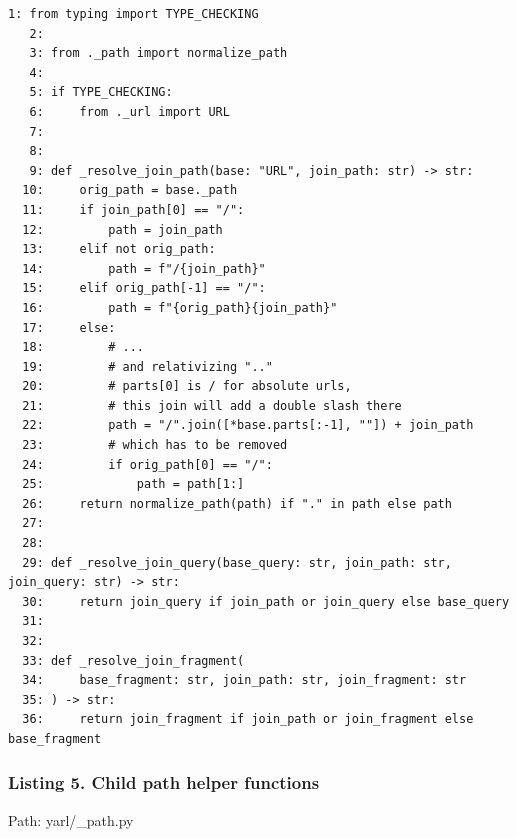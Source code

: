 \documentclass[11pt,a4paper]{article}
\begin{document}
\begin{Verbatim}[breaklines=true,fontsize=\scriptsize]
1: from typing import TYPE_CHECKING
   2: 
   3: from ._path import normalize_path
   4: 
   5: if TYPE_CHECKING:
   6:     from ._url import URL
   7: 
   8: 
   9: def _resolve_join_path(base: "URL", join_path: str) -> str:
  10:     orig_path = base._path
  11:     if join_path[0] == "/":
  12:         path = join_path
  13:     elif not orig_path:
  14:         path = f"/{join_path}"
  15:     elif orig_path[-1] == "/":
  16:         path = f"{orig_path}{join_path}"
  17:     else:
  18:         # ...
  19:         # and relativizing ".."
  20:         # parts[0] is / for absolute urls,
  21:         # this join will add a double slash there
  22:         path = "/".join([*base.parts[:-1], ""]) + join_path
  23:         # which has to be removed
  24:         if orig_path[0] == "/":
  25:             path = path[1:]
  26:     return normalize_path(path) if "." in path else path
  27: 
  28: 
  29: def _resolve_join_query(base_query: str, join_path: str, join_query: str) -> str:
  30:     return join_query if join_path or join_query else base_query
  31: 
  32: 
  33: def _resolve_join_fragment(
  34:     base_fragment: str, join_path: str, join_fragment: str
  35: ) -> str:
  36:     return join_fragment if join_path or join_fragment else base_fragment
\end{Verbatim}


\subsubsection*{Listing 5. Child path helper functions}


Path: yarl/\_path.py
\end{document}
